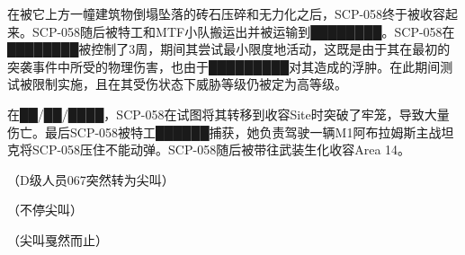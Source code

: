 在被它上方一幢建筑物倒塌坠落的砖石压碎和无力化之后，SCP-058终于被收容起来。SCP-058随后被特工和MTF小队搬运出并被运输到████████。SCP-058在████████被控制了3周，期间其尝试最小限度地活动，这既是由于其在最初的突袭事件中所受的物理伤害，也由于█████████对其造成的浮肿。在此期间测试被限制实施，且在其受伤状态下威胁等级仍被定为高等级。

在██\slash ██\slash ████，SCP-058在试图将其转移到收容Site时突破了牢笼，导致大量伤亡。最后SCP-058被特工██████捕获，她负责驾驶一辆M1阿布拉姆斯主战坦克将SCP-058压住不能动弹。SCP-058随后被带往武装生化收容Area 14。


\begin{scpbox}








（D级人员067突然转为尖叫）


（不停尖叫）



（尖叫戛然而止）



\end{scpbox}
